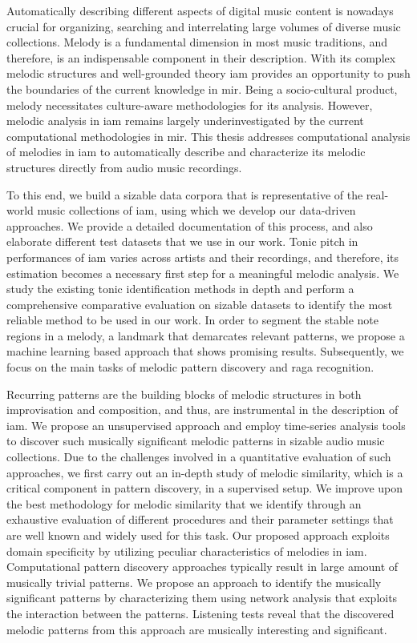 
Automatically describing different aspects of digital music content is nowadays crucial for organizing, searching and interrelating large volumes of diverse music collections. Melody is a fundamental dimension in most music traditions, and therefore, is an indispensable component in their description. With its complex melodic structures and well-grounded theory \gls{iam} provides an opportunity to push the boundaries of the current knowledge in \gls{mir}. Being a socio-cultural product, melody necessitates culture-aware methodologies for its analysis. However, melodic analysis in \gls{iam} remains largely underinvestigated by the current computational methodologies in \gls{mir}. This thesis addresses computational analysis of melodies in \gls{iam} to automatically describe and characterize its melodic structures directly from audio music recordings. 

To this end, we build a sizable data corpora that is representative of the real-world music collections of \gls{iam}, using which we develop our data-driven approaches. We provide a detailed documentation of this process, and also elaborate different test datasets that we use in our work. Tonic pitch in performances of \gls{iam} varies across artists and their recordings, and therefore, its estimation becomes a necessary first step for a meaningful melodic analysis.  We study the existing tonic identification methods in depth and perform a comprehensive comparative evaluation on sizable datasets to identify the most reliable method to be used in our work. In order to segment the stable note regions in a melody, a landmark that demarcates relevant patterns, we propose a machine learning based approach that shows promising results. Subsequently, we focus on the main tasks of melodic pattern discovery and raga recognition. 

Recurring patterns are the building blocks of melodic structures in both improvisation and composition, and thus, are instrumental in the description of \gls{iam}. We propose an unsupervised approach and employ time-series analysis tools to discover such musically significant melodic patterns in sizable audio music collections. Due to the challenges involved in a quantitative evaluation of such approaches, we first carry out an in-depth study of  melodic similarity, which is a critical component in pattern discovery, in a supervised setup. We improve upon the best methodology for melodic similarity that we identify through an exhaustive evaluation of different procedures and their parameter settings that are well known and widely used for this task. Our proposed approach exploits domain specificity by utilizing peculiar characteristics of melodies in \gls{iam}. Computational pattern discovery approaches typically result in large amount of musically trivial patterns. We propose an approach to identify the musically significant patterns by characterizing them using network analysis that exploits the interaction between the patterns. Listening tests reveal that the discovered melodic patterns from this approach are musically interesting and significant.

